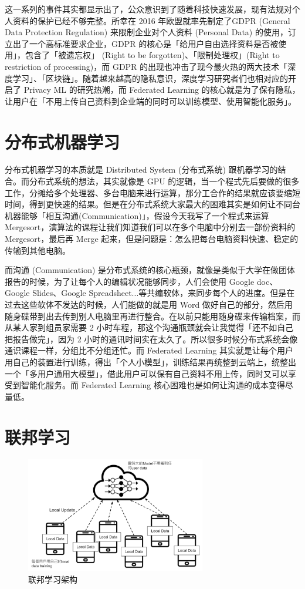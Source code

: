  
这一系列的事件其实都显示出了，公众意识到了随着科技快速发展，现有法规对个人资料的保护已经不够完整。所幸在 2016 年欧盟就率先制定了GDPR (General Data Protection Regulation) 来限制企业对个人资料 (Personal Data) 的使用，订立出了一个高标准要求企业，GDPR 的核心是「给用户自由选择资料是否被使用」，包含了「被遗忘权」 (Right to be forgotten)、「限制处理权」(Right to restriction of processing)，而 GDPR 的出现也冲击了现今最火热的两大技术「深度学习」、「区块链」。随着越来越高的隐私意识，深度学习研究者们也相对应的开启了 Privacy ML 的研究热潮，而 Federated Learning 的核心就是为了保有隐私，让用户在「不用上传自己资料到企业端的同时可以训练模型、使用智能化服务」。

\section{分布式机器学习}

分布式机器学习的本质就是 Distributed System (分布式系统) 跟机器学习的结合。而分布式系统的想法，其实就像是 GPU 的逻辑，当一个程式先后要做的很多工作，分摊给多个处理器、多台电脑来进行运算，那分工合作的结果就应该要缩短时间，得到更快速的结果。但是在分布式系统大家最大的困难其实是如何让不同台机器能够「相互沟通(Communication)」，假设今天我写了一个程式来运算 Mergesort，演算法的课程让我们知道我们可以在多个电脑中分别去一部份资料的 Mergesort，最后再 Merge 起来，但是问题是：怎么把每台电脑资料快速、稳定的传输到其他电脑。

 而沟通 (Communication) 是分布式系统的核心瓶颈，就像是类似于大学在做团体报告的时候，为了让每个人的编辑状况能够同步，人们会使用 Google doc、Google Slides、Google Spreadsheet...等共编软体，来同步每个人的进度。但是在过去这些软体不发达的时候，人们能做的就是用 Word 做好自己的部分，然后用随身碟带到出去传到别人电脑里再进行整合。在以前只能用随身碟来传输档案，而从某人家到组员家需要 2 小时车程，那这个沟通瓶颈就会让我觉得「还不如自己把报告做完」，因为 2 小时的通讯时间实在太久了。所以很多时候分布式系统会像通识课程一样，分组比不分组还忙。而 Federated Learning 其实就是让每个用户用自己的装置进行训练，得出「个人小模型」，训练结果再统整到云端上，统整出一个「多用户通用大模型」，借此用户可以保有自己资料不用上传，同时又可以享受到智能化服务。而 Federated Learning 核心困难也是如何让沟通的成本变得尽量低。
 
\section{联邦学习}

\begin{figure}[htb]
\centering 
\includegraphics[width=0.70\textwidth]{img/newch2m1.png} 
\caption{联邦学习架构}
\label{Test}
\end{figure}

